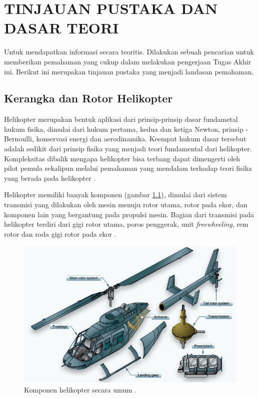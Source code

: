 \chapter{TINJAUAN PUSTAKA DAN DASAR TEORI}
\label{chap:tinjauanpustaka}

\thispagestyle{newchap}
Untuk mendapatkan informasi secara teoritis. Dilakukan sebuah pencarian untuk memberikan pemahaman yang cukup dalam melakukan pengerjaan Tugas Akhir ini. Berikut ini merupakan tinjauan pustaka yang menjadi landasan pemahaman.

\section{Kerangka dan Rotor Helikopter}
\label{sec:strukturheli}

Helikopter merupakan bentuk aplikasi dari prinsip-prinsip dasar fundametal hukum fisika, dimulai dari hukum pertama, kedua dan ketiga Newton, prinsip \hyp{}Bernoulli, konservasi energi dan aerodinamika. Keempat hukum dasar tersebut adalah sedikit dari prinsip fisika yang menjadi teori fundamental dari helikopter. Kompleksitas dibalik mengapa helikopter bisa terbang dapat dimengerti oleh pilot pemula sekalipun melalui pemahaman yang mendalam terhadap teori fisika yang berada pada helikopter \cite{wagtendonk2006principles}.

Helikopter memiliki banyak komponen (gambar \ref{fig:komponenheli}), dimulai dari sistem transmisi yang dilakukan oleh mesin menuju rotor utama, rotor pada ekor, dan komponen lain yang bergantung pada propulsi mesin. Bagian dari transmisi pada helikopter terdiri dari gigi rotor utama, poros penggerak, unit \textit{freewheeling}, rem rotor dan roda gigi rotor pada ekor  \cite{wagtendonk2006principles}.

\begin{figure}[H]
	\centering
	\includegraphics[width=0.65\linewidth]{gambar/komponenheli.png}
	\caption{Komponen helikopter secara umum \cite{handbook}.}
	\label{fig:komponenheli}
\end{figure}

